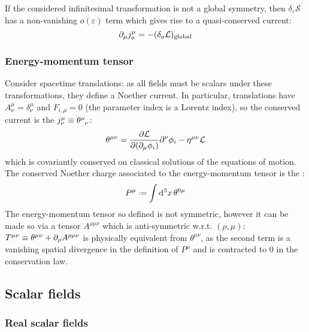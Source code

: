 If the considered infinitesimal transformation is not a global symmetry, then $ \delta_\varepsilon \mathcal{S} $ has a non-vanishing $ o(\varepsilon) $ term which gives rise to a quasi-conserved current:
\begin{equation}
  \partial_\mu j_a^\mu = - (\delta_a \mathcal{L})_\mathrm{global}
\end{equation}

\subsubsection{Energy-momentum tensor}

Consider spacetime translations: as all fields must be scalars under these transformations, they define a Noether current. In particular, translations have $ A^\mu_\nu = \delta^\mu_\nu $ and $ F_{i,\mu} = 0 $ (the parameter index is a Lorentz index), so the conserved current is the  $ j^\mu_\nu \equiv \tensor{\theta}{^\mu_\nu} $:
\begin{equation}
  \theta^{\mu \nu} = \frac{\partial \mathcal{L}}{\partial (\partial_\mu \phi_i)} \partial^\nu \phi_i - \eta^{\mu \nu} \mathcal{L}
  \label{eq:en-mom-tensor}
\end{equation}
which is covariantly conserved on classical solutions of the equations of motion. The conserved Noether charge associated to the energy-momentum tensor is the :
\begin{equation}
  P^\mu \defeq \int \dd^3 x\, \theta^{0 \mu}
  \label{eq:4-mom-def}
\end{equation}
The energy-momentum tensor so defined is not symmetric, however it can be made so via a tensor $ A^{\rho \mu \nu} $ which is anti-symmetric w.r.t. $ (\rho,\mu) $: $ T^{\mu \nu} \equiv \theta^{\mu \nu} + \partial_\rho A^{\rho \mu \nu} $ is physically equivalent from $ \theta^{\mu \nu} $, as the second term is a vanishing spatial divergence in the definition of $ P^\mu $ and is contracted to 0 in the conservation law.

\subsection{Scalar fields}

\subsubsection{Real scalar fields}

